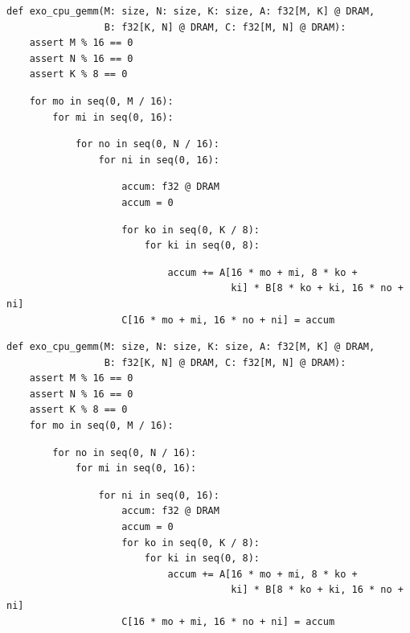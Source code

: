 \begin{minipage}[t]{0.5\textwidth}\codeminipage
\tiny
\begin{verbatim}
def exo_cpu_gemm(M: size, N: size, K: size, A: f32[M, K] @ DRAM,
                 B: f32[K, N] @ DRAM, C: f32[M, N] @ DRAM):
    assert M % 16 == 0
    assert N % 16 == 0
    assert K % 8 == 0
\end{verbatim}
\begin{mdframed}[style=MyFrame, backgroundcolor=yellowBoxBg]
\color{yellowBoxFg}
\begin{verbatim}
    for mo in seq(0, M / 16):
        for mi in seq(0, 16):
\end{verbatim}
\end{mdframed}
\begin{mdframed}[style=MyFrame, backgroundcolor=greenBoxBg]
\color{greenBoxFg}
\begin{verbatim}
            for no in seq(0, N / 16):
                for ni in seq(0, 16):
\end{verbatim}
\end{mdframed}
\begin{verbatim}
                    accum: f32 @ DRAM
                    accum = 0
\end{verbatim}
\begin{mdframed}[style=MyFrame, backgroundcolor=violetBoxBg]
\color{violetBoxFg}
\begin{verbatim}
                    for ko in seq(0, K / 8):
                        for ki in seq(0, 8):
\end{verbatim}
\end{mdframed}
\begin{verbatim}
                            accum += A[16 * mo + mi, 8 * ko +
                                       ki] * B[8 * ko + ki, 16 * no + ni]
                    C[16 * mo + mi, 16 * no + ni] = accum
\end{verbatim}
\vspace{5mm}
\begin{verbatim}
def exo_cpu_gemm(M: size, N: size, K: size, A: f32[M, K] @ DRAM,
                 B: f32[K, N] @ DRAM, C: f32[M, N] @ DRAM):
    assert M % 16 == 0
    assert N % 16 == 0
    assert K % 8 == 0
    for mo in seq(0, M / 16):
\end{verbatim}
\begin{mdframed}[style=MyFrame, backgroundcolor=blueBoxBg]
\color{blueBoxFg}
\begin{verbatim}
        for no in seq(0, N / 16):
            for mi in seq(0, 16):
\end{verbatim}
\end{mdframed}
\begin{verbatim}
                for ni in seq(0, 16):
                    accum: f32 @ DRAM
                    accum = 0
                    for ko in seq(0, K / 8):
                        for ki in seq(0, 8):
                            accum += A[16 * mo + mi, 8 * ko +
                                       ki] * B[8 * ko + ki, 16 * no + ni]
                    C[16 * mo + mi, 16 * no + ni] = accum
\end{verbatim}
\end{minipage}
